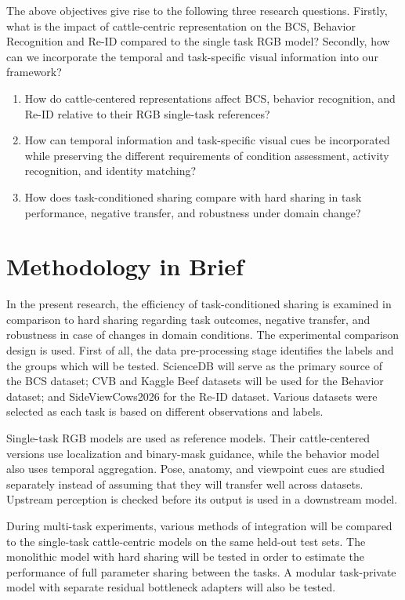 The above objectives give rise to the following three research questions. Firstly, what is the impact of cattle-centric representation on the BCS, Behavior Recognition and Re-ID compared to the single task RGB model? Secondly, how can we incorporate the temporal and task-specific visual information into our framework?
\begin{enumerate}
    \item How do cattle-centered representations affect BCS, behavior recognition, and Re-ID relative to their RGB single-task references?
    \item How can temporal information and task-specific visual cues be incorporated while preserving the different requirements of condition assessment, activity recognition, and identity matching?
    \item How does task-conditioned sharing compare with hard sharing in task performance, negative transfer, and robustness under domain change?
\end{enumerate}

\section{Methodology in Brief}

In the present research, the efficiency of task-conditioned sharing is examined in comparison to hard sharing regarding task outcomes, negative transfer, and robustness in case of changes in domain conditions. The experimental comparison design is used. First of all, the data pre-processing stage identifies the labels and the groups which will be tested. ScienceDB will serve as the primary source of the BCS dataset; CVB and Kaggle Beef datasets will be used for the Behavior dataset; and SideViewCows2026 for the Re-ID dataset. Various datasets were selected as each task is based on different observations and labels.

Single-task RGB models are used as reference models. Their cattle-centered versions use localization and binary-mask guidance, while the behavior model also uses temporal aggregation. Pose, anatomy, and viewpoint cues are studied separately instead of assuming that they will transfer well across datasets. Upstream perception is checked before its output is used in a downstream model.

During multi-task experiments, various methods of integration will be compared to the single-task cattle-centric models on the same held-out test sets. The monolithic model with hard sharing will be tested in order to estimate the performance of full parameter sharing between the tasks. A modular task-private model with separate residual bottleneck adapters will also be tested.

